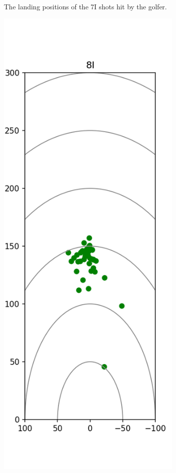 \documentclass{kththesis}
\begin{document}
\begin{figure}
\begin{subfigure}{0.4\textwidth}
    \caption{The landing positions of the 7I shots hit by the golfer.}
    \label{fig:7I_shots}
    \end{subfigure}
    \begin{subfigure}{0.4\textwidth}
    \centering
    \includegraphics[height=0.4\textheight]{Shots/8I_shots.png} 

\end{subfigure}
\end{figure}
\end{document}
